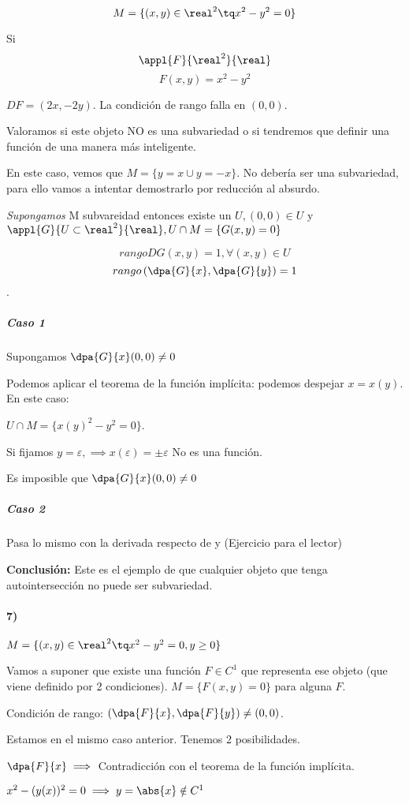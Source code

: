   \[M = \{(x,y)\in \real^2 \tq x^2-y^2 = 0\}\]
  
  Si 
	\[\appl{F}{\real^2}{\real}\]
	\[F(x,y) = x^2-y^2\]
  
  $DF = (2x,-2y)$. La condición de rango falla en $(0,0)$.
  
  Valoramos si este objeto NO es una subvariedad o si tendremos que definir una función de una manera más inteligente.
  
  En este caso, vemos que $M = \{ y=x \cup y = -x \}$. No debería ser una subvariedad, para ello vamos a intentar demostrarlo por reducción al absurdo.
  
  \emph{Supongamos} M subvareidad entonces existe un $U, (0,0) \in U$ y $\appl{G}{U\subset\real^2}{\real}, U\cap M = \{G(x,y) = 0\}$
  
\[rango DG(x,y) = 1, \forall(x,y) \in U\]
\[rango\left(\dpa{G}{x},\dpa{G}{y}\right) = 1\].

\subparagraph{Caso 1} Supongamos $\dpa{G}{x}(0,0) \neq 0$

Podemos aplicar el teorema de la función implícita: podemos despejar $x = x(y)$. En este caso:

$U \cap M = \{x(y)^2-y^2 = 0\}$.

Si fijamos $y=\varepsilon, \implies x(\varepsilon) = \pm \varepsilon$ No es una función. 

Es imposible que $\dpa{G}{x}(0,0) \neq 0$

\subparagraph{Caso 2} Pasa lo mismo con la derivada respecto de y (Ejercicio para el lector)


\textbf{Conclusión: } Este es el ejemplo de que cualquier objeto que tenga autointersección no puede ser subvariedad.


\paragraph{7)} $M = \{(x,y) \in \real^2 \tq x^2-y^2 = 0, y\ge 0\}$

Vamos a suponer que existe una función $F \in C^1$ que representa ese objeto (que viene definido por 2 condiciones). $M = \{F(x,y) = 0\}$ para alguna $F$.

Condición de rango: $\left(\dpa{F}{x},\dpa{F}{y}\right) \neq (0,0)$.

Estamos en el mismo caso anterior. Tenemos 2 posibilidades.

 $\dpa{F}{x} \implies $ Contradicción con el teorema de la función implícita.
 
 $x^2 - (y(x))^2 = 0 \implies y = \abs{x} \notin C^1$
 
